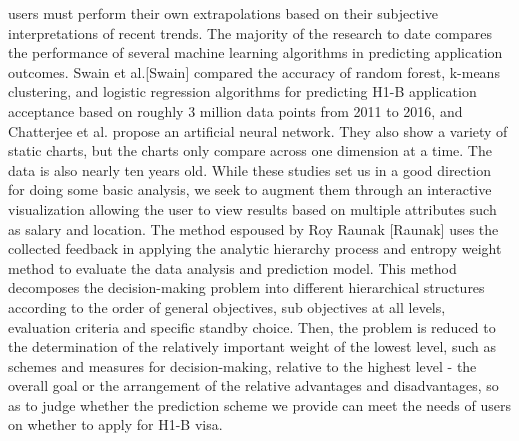 \documentclass[sigconf]{acmart}
\begin{document}
users must perform their own extrapolations based on their subjective interpretations of recent trends.
The majority of the research to date compares the performance of several machine learning algorithms in predicting application outcomes. 
Swain et al.[Swain] compared the accuracy of random forest, k-means clustering, and logistic regression algorithms for predicting 
H1-B application acceptance based on roughly 3 million data points from 2011 to 2016, and Chatterjee et al. propose an artificial 
neural network. They also show a variety of static charts, but the charts only compare across one dimension at a time. The data is 
also nearly ten years old. While these studies set us in a good direction for doing some basic analysis, we seek to augment them 
through an interactive visualization allowing the user to view results based on multiple attributes such as salary and location.
The method espoused by Roy Raunak [Raunak] uses the collected feedback in applying the analytic hierarchy process and entropy 
weight method to evaluate the data analysis and prediction model. This method decomposes the decision-making problem into different 
hierarchical structures according to the order of general objectives, sub objectives at all levels, evaluation criteria and specific 
standby choice. Then, the problem is reduced to the determination of the relatively important weight of the lowest level, such as 
schemes and measures for decision-making, relative to the highest level - the overall goal or the arrangement of the relative 
advantages and disadvantages, so as to judge whether the prediction scheme we provide can meet the needs of users on whether to 
apply for H1-B visa.
\end{document}

